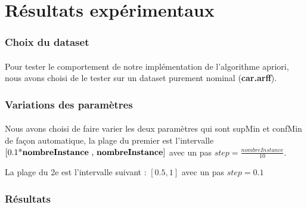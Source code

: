 	\section{Résultats expérimentaux}
		\subsubsection{Choix du dataset}
			\paragraph{}
			Pour tester le comportement de notre implémentation de l'algorithme apriori, nous avons choisi de le tester sur un dataset purement nominal (\textbf{car.arff}).
		\subsubsection{Variations des paramètres}
			\paragraph{}
			Nous avons choisi de faire varier les deux paramètres qui sont supMin et confMin de façon automatique, la plage du premier est l'intervalle $\left[ \text{0.1*\textbf{nombreInstance} , \textbf{nombreInstance}} \right]$ avec un pas $step = \frac{ nombreInstance}{10}$.
			\par 
			La plage du 2e est l'intervalle suivant : $\left[ 0.5 , 1\right]$ avec un pas $step = 0.1$
		\subsubsection{Résultats}
